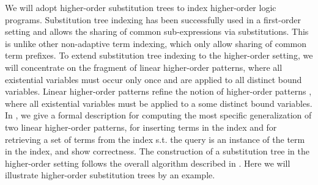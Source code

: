\documentclass{llncs}
\begin{document}
We will adopt higher-order substitution trees
\cite{Pientka:ICLP03,Pientka03phd} to index higher-order logic
programs. Substitution tree indexing has been successfully used in a
first-order setting \cite{Graf+Book95} and  allows the sharing of
common sub-expressions via substitutions. This is unlike other
non-adaptive term indexing, which only allow sharing of common term
prefixes. To extend substitution tree indexing to the higher-order
setting, we will concentrate on the fragment of linear higher-order
patterns\cite{PientkaPfenning:CADE03}, where all existential variables
must occur only once and are applied to all distinct bound
variables. Linear higher-order patterns refine the notion of
higher-order patterns  \cite{Miller91iclp}, where all existential
variables must be applied to a some distinct bound variables.  In
\cite{Pientka:ICLP03,Pientka03phd}, we give a formal description for
computing the most specific generalization of two linear higher-order
patterns, for inserting terms in the index and for retrieving a set of
terms from the index s.t. the query is an instance of the term in the
index, and show correctness. The construction of a substitution tree
in the higher-order setting follows the overall algorithm described in
\cite{Ramakrishnan01:indexing}. Here we will illustrate higher-order
substitution trees by an example. 
\end{document}
